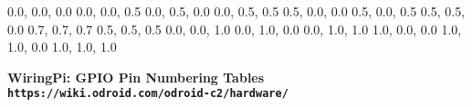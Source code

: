 \documentclass[12pt,a4paper]{article}
\begin{document}
\begin{sffamily}
\definecolor{rtb-black}{rgb}  {0.0, 0.0, 0.0}
\definecolor{rtb-navy}{rgb}   {0.0, 0.0, 0.5}
\definecolor{rtb-green}{rgb}  {0.0, 0.5, 0.0}
\definecolor{rtb-teal}{rgb}   {0.0, 0.5, 0.5}
\definecolor{rtb-maroon}{rgb} {0.5, 0.0, 0.0}
\definecolor{rtb-purple}{rgb} {0.5, 0.0, 0.5}
\definecolor{rtb-olive}{rgb}  {0.5, 0.5, 0.0}
\definecolor{rtb-silver}{rgb} {0.7, 0.7, 0.7}
\definecolor{rtb-grey}{rgb}   {0.5, 0.5, 0.5}
\definecolor{rtb-blue}{rgb}   {0.0, 0.0, 1.0}
\definecolor{rtb-lime}{rgb}   {0.0, 1.0, 0.0}
\definecolor{rtb-aqua}{rgb}   {0.0, 1.0, 1.0}
\definecolor{rtb-red}{rgb}    {1.0, 0.0, 0.0}
\definecolor{rtb-yellow}{rgb} {1.0, 1.0, 0.0}
\definecolor{rtb-white}{rgb}  {1.0, 1.0, 1.0}

\begin{center}
\bfseries{WiringPi: GPIO Pin Numbering Tables}\\
\tt{https://wiki.odroid.com/odroid-c2/hardware/}
\end{center}


\end{sffamily}
\end{document}
